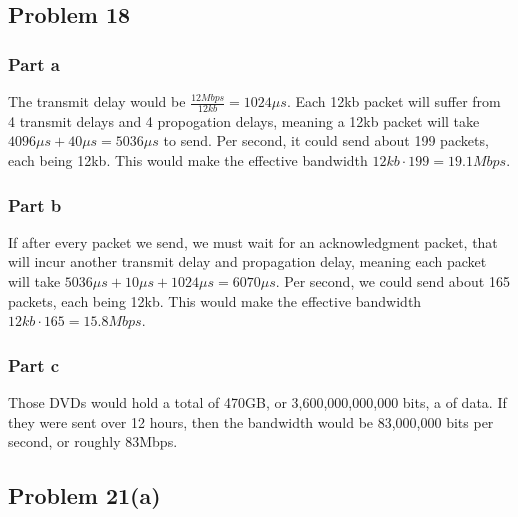 \documentclass{article}%
\begin{document}
\subsection*{Problem 18}

\subsubsection*{Part a}

The transmit delay would be $\frac{12Mbps}{12kb} = 1024\mu s$. Each 12kb packet will suffer from 4 transmit delays and 4
propogation delays, meaning a 12kb packet will take $4096\mu s + 40\mu s = 5036\mu s$ to send. Per second, it could send about
199 packets, each being 12kb. This would make the effective bandwidth $12kb \cdot 199 = 19.1Mbps$.

\subsubsection*{Part b}

If after every packet we send, we must wait for an acknowledgment packet, that will incur another transmit delay and propagation delay,
meaning each packet will take $5036\mu s + 10\mu s + 1024\mu s = 6070\mu s$. Per second, we could send about 165 packets, each being 12kb.
This would make the effective bandwidth $12kb \cdot 165 = 15.8Mbps$.

\subsubsection*{Part c}

Those DVDs would hold a total of 470GB, or 3,600,000,000,000 bits, a of data. If they were sent over 12 hours, then the bandwidth
would be 83,000,000 bits per second, or roughly 83Mbps.


\subsection*{Problem 21(a)}
\end{document}
